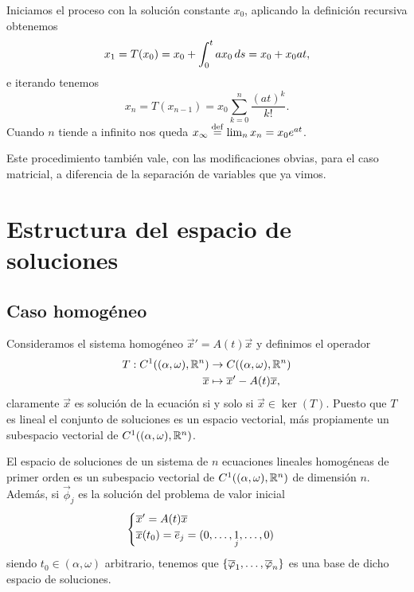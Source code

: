 \documentclass[../ecuaciones_diferenciales.tex]{subfiles}
\begin{document}
\begin{solution}
	Iniciamos el proceso con la solución constante \(x_0\), aplicando la
    definición recursiva obtenemos
	\[x_1 = T(x_0) = x_0 + \int_0^t a x_0 \mathop{d\!} s = x_0 + x_0 a t,\]
	e iterando tenemos
	\[x_n = T(x_{n - 1}) = x_0 \sum_{k = 0}^n \frac{(at)^k}{k!}.\]
	Cuando \(n\) tiende a infinito nos queda
	\(x_\infty \overset{\operatorname{def}}{=} \lim_n x_n = x_0 e^{at}\).
\end{solution}

\begin{remark}
	Este procedimiento también vale, con las modificaciones obvias, para el caso
	matricial, a diferencia de la separación de variables que ya vimos.
\end{remark}

\section{Estructura del espacio de soluciones}

\subsection{Caso homogéneo}

Consideramos el sistema homogéneo \(\vec{x}' = A(t) \vec{x}\) y definimos el
operador
\begin{align*}
	T : C^1((\alpha, \omega), \mathbb{R}^n) & \to C((\alpha, \omega), \mathbb{R}^n) \\
							\overline{x} & \mapsto \overline{x}' - A(t)\overline{x},
\end{align*}
claramente \(\vec{x}\) es solución de la ecuación si y solo si
\(\vec{x} \in \ker(T)\).
Puesto que \(T\) es lineal el conjunto de soluciones es un espacio vectorial,
más propiamente un subespacio vectorial de \(C^1((\alpha, \omega), \mathbb{R}^n)\).

\begin{theorem}
	El espacio de soluciones de un sistema de \(n\) ecuaciones lineales
    homogéneas de primer orden es un subespacio vectorial de
    \(C^1((\alpha, \omega), \mathbb{R}^n)\) de dimensión \(n\). Además, si
    \(\vec{\phi}_j\) es la solución del problema de valor inicial
	\[\begin{cases}
		\overline{x}' = A(t)\overline{x} \\
		\overline{x}(t_0) = \overline{e}_j = (0, \dots, \underset{j}{1}, \dots, 0)\end{cases}\]
    siendo \(t_0 \in (\alpha, \omega)\) arbitrario, tenemos que
    \(\set{\vec{\phi}_1, \dots, \vec{\phi}_n}\) es una base de dicho espacio de
    soluciones.
\end{theorem}
\end{document}
